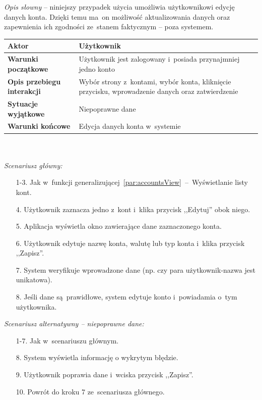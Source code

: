 \textit{Opis słowny} -- niniejszy przypadek użycia umożliwia użytkownikowi edycję danych konta. Dzięki temu ma~on możliwość aktualizowania danych oraz zapewnienia ich zgodności ze~stanem faktycznym -- poza systemem.\\

\begin{tabular}{|l|p{9cm}|}
  \hline \textbf{Aktor} & Użytkownik \\ \hline
  \textbf{Warunki początkowe} & Użytkownik jest zalogowany i~posiada przynajmniej jedno konto \\ \hline
  \textbf{Opis przebiegu interakcji} & Wybór strony z~kontami, wybór konta, kliknięcie przycisku, wprowadzenie danych oraz zatwierdzenie \\ \hline
  \textbf{Sytuacje wyjątkowe} & Niepoprawne dane \\ \hline
  \textbf{Warunki końcowe} & Edycja danych konta w~systemie \\ \hline
\end{tabular}\\\\

\noindent \textit{Scenariusz główny:}
\begin{enumerate}
  \item[1-3.] Jak w~funkcji generalizującej~\ref{par:accountsView}~--~Wyświetlanie listy kont.
  \item[4.] Użytkownik zaznacza jedno z~kont i~klika przycisk ,,Edytuj'' obok niego.
  \item[5.] Aplikacja wyświetla okno zawierające dane zaznaczonego konta.
  \item[6.] Użytkownik edytuje nazwę konta, walutę lub typ konta i~klika przycisk ,,Zapisz''.
  \item[7.] System weryfikuje wprowadzone dane (np. czy para użytkownik-nazwa jest unikatowa).
  \item[8.] Jeśli dane są~prawidłowe, system edytuje konto i~powiadamia o~tym użytkownika.
\end{enumerate}

\noindent \textit{Scenariusz alternatywny -- niepoprawne dane:}
\begin{enumerate}
  \item[1-7.] Jak w~scenariuszu głównym.
  \item[8.] System wyświetla informację o wykrytym błędzie.
  \item[9.] Użytkownik poprawia dane i~wciska przycisk ,,Zapisz''.
  \item[10.] Powrót do kroku 7 ze~scenariusza głównego.
\end{enumerate}

